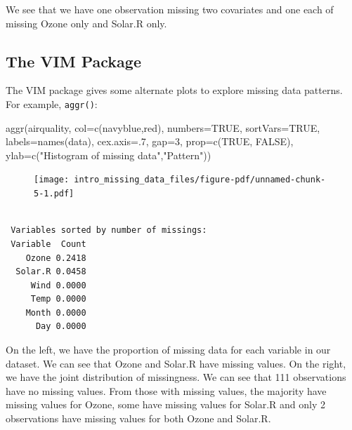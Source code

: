 \documentclass[
  letterpaper,
  DIV=11,
  numbers=noendperiod]{scrreprt}
\newenvironment{Shaded}{\begin{snugshade}}{\end{snugshade}}
\newcommand{\AttributeTok}[1]{\textcolor[rgb]{0.49,0.56,0.16}{#1}}
\newcommand{\ConstantTok}[1]{\textcolor[rgb]{0.53,0.00,0.00}{#1}}
\newcommand{\DecValTok}[1]{\textcolor[rgb]{0.25,0.63,0.44}{#1}}
\newcommand{\FunctionTok}[1]{\textcolor[rgb]{0.02,0.16,0.49}{#1}}
\newcommand{\NormalTok}[1]{\textcolor[rgb]{0.00,0.44,0.13}{#1}}
\newcommand{\StringTok}[1]{\textcolor[rgb]{0.25,0.44,0.63}{#1}}
\begin{document}
We see that we have one observation missing two covariates and one each
of missing Ozone only and Solar.R only.

\hypertarget{the-vim-package}{%
\subsection{The VIM Package}\label{the-vim-package}}

The VIM package gives some alternate plots to explore missing data
patterns. For example, \texttt{aggr()}:

\begin{Shaded}
\begin{Highlighting}[]
 \FunctionTok{aggr}\NormalTok{(airquality, }\AttributeTok{col=}\FunctionTok{c}\NormalTok{(}\StringTok{\textquotesingle{}navyblue\textquotesingle{}}\NormalTok{,}\StringTok{\textquotesingle{}red\textquotesingle{}}\NormalTok{),}
      \AttributeTok{numbers=}\ConstantTok{TRUE}\NormalTok{, }\AttributeTok{sortVars=}\ConstantTok{TRUE}\NormalTok{, }\AttributeTok{labels=}\FunctionTok{names}\NormalTok{(data),}
      \AttributeTok{cex.axis=}\NormalTok{.}\DecValTok{7}\NormalTok{, }\AttributeTok{gap=}\DecValTok{3}\NormalTok{, }\AttributeTok{prop=}\FunctionTok{c}\NormalTok{(}\ConstantTok{TRUE}\NormalTok{, }\ConstantTok{FALSE}\NormalTok{), }
      \AttributeTok{ylab=}\FunctionTok{c}\NormalTok{(}\StringTok{"Histogram of missing data"}\NormalTok{,}\StringTok{"Pattern"}\NormalTok{))}
\end{Highlighting}
\end{Shaded}

\begin{figure}[H]

{\centering \texttt{[image: intro\_missing\_data\_files/figure-pdf/unnamed-chunk-5-1.pdf]}

}

\end{figure}

\begin{verbatim}

 Variables sorted by number of missings: 
 Variable  Count
    Ozone 0.2418
  Solar.R 0.0458
     Wind 0.0000
     Temp 0.0000
    Month 0.0000
      Day 0.0000
\end{verbatim}

On the left, we have the proportion of missing data for each variable in
our dataset. We can see that Ozone and Solar.R have missing values. On
the right, we have the joint distribution of missingness. We can see
that 111 observations have no missing values. From those with missing
values, the majority have missing values for Ozone, some have missing
values for Solar.R and only 2 observations have missing values for both
Ozone and Solar.R.
\end{document}
